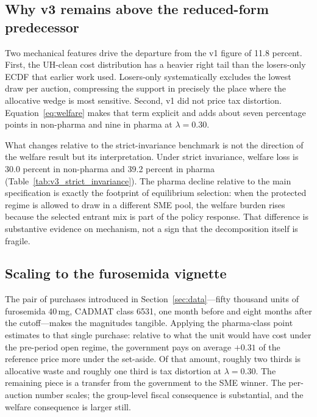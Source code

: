\subsection{Why v3 remains above the reduced-form predecessor}

Two mechanical features drive the departure from the v1 figure of 11.8 percent. First, the UH-clean cost distribution has a heavier right tail than the losers-only ECDF that earlier work used. Losers-only systematically excludes the lowest draw per auction, compressing the support in precisely the place where the allocative wedge is most sensitive. Second, v1 did not price tax distortion. Equation~\eqref{eq:welfare} makes that term explicit and adds about seven percentage points in non-pharma and nine in pharma at $\lambda = 0.30$.

What changes relative to the strict-invariance benchmark is not the direction of the welfare result but its interpretation. Under strict invariance, welfare loss is 30.0 percent in non-pharma and 39.2 percent in pharma (Table~\ref{tab:v3_strict_invariance}). The pharma decline relative to the main specification is exactly the footprint of equilibrium selection: when the protected regime is allowed to draw in a different SME pool, the welfare burden rises because the selected entrant mix is part of the policy response. That difference is substantive evidence on mechanism, not a sign that the decomposition itself is fragile.

\subsection{Scaling to the furosemida vignette}

The pair of purchases introduced in Section~\ref{sec:data}---fifty thousand units of furosemida 40\,mg, CADMAT class 6531, one month before and eight months after the cutoff---makes the magnitudes tangible. Applying the pharma-class point estimates to that single purchase: relative to what the unit would have cost under the pre-period open regime, the government pays on average $+0.31$ of the reference price more under the set-aside. Of that amount, roughly two thirds is allocative waste and roughly one third is tax distortion at $\lambda = 0.30$. The remaining piece is a transfer from the government to the SME winner. The per-auction number scales; the group-level fiscal consequence is substantial, and the welfare consequence is larger still.
